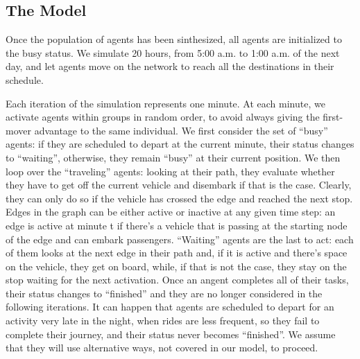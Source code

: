 \subsection{The Model}

Once the population of agents has been sinthesized, all agents are initialized to the busy status. We simulate 20 hours, from 5:00 a.m. to 1:00 a.m. of the next day, and let agents move on the network to reach all the destinations in their schedule. 

Each iteration of the simulation represents one minute. At each minute, we activate agents within groups in random order, to avoid always giving the first-mover advantage to the same individual. We first consider the set of “busy” agents: if they are scheduled to depart at the current minute, their status changes to “waiting”, otherwise, they remain “busy” at their current position. We then loop over the “traveling” agents: looking at their path, they evaluate whether they have to get off the current vehicle and disembark if that is the case. Clearly, they can only do so if the vehicle has crossed the edge and reached the next stop. Edges in the graph can be either active or inactive at any given time step: an edge is active at minute t if there’s a vehicle that is passing at the starting node of the edge and can embark passengers. “Waiting” agents are the last to act: each of them looks at the next edge in their path and, if it is active and there’s space on the vehicle, they get on board, while, if that is not the case, they stay on the stop waiting for the next activation. Once an angent completes all of their tasks, their status changes to “finished” and they are no longer considered in the following iterations. It can happen that agents are scheduled to depart for an activity very late in the night, when rides are less frequent, so they fail to complete their journey, and their status never becomes “finished”. We assume that they will use alternative ways, not covered in our model, to proceed.

